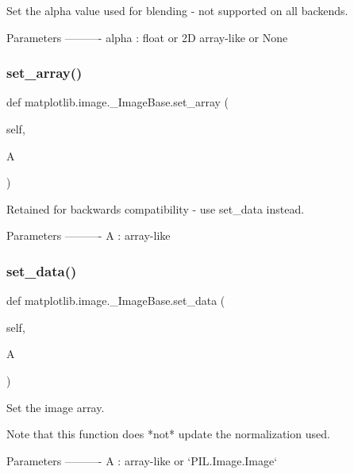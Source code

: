 \begin{DoxyVerb}Set the alpha value used for blending - not supported on all backends.

Parameters
----------
alpha : float or 2D array-like or None
\end{DoxyVerb}
 \mbox{\label{classmatplotlib_1_1image_1_1__ImageBase_a72eb246b58a230e18e8eeef1fee6d7b8}} 
\subsubsection{\texorpdfstring{set\+\_\+array()}{set\_array()}}
{\footnotesize\ttfamily def matplotlib.\+image.\+\_\+\+Image\+Base.\+set\+\_\+array (\begin{DoxyParamCaption}\item[{}]{self,  }\item[{}]{A }\end{DoxyParamCaption})}

\begin{DoxyVerb}Retained for backwards compatibility - use set_data instead.

Parameters
----------
A : array-like
\end{DoxyVerb}
 \mbox{\label{classmatplotlib_1_1image_1_1__ImageBase_a6300e9bfe249af97fc7a8df11086e03d}} 
\subsubsection{\texorpdfstring{set\+\_\+data()}{set\_data()}}
{\footnotesize\ttfamily def matplotlib.\+image.\+\_\+\+Image\+Base.\+set\+\_\+data (\begin{DoxyParamCaption}\item[{}]{self,  }\item[{}]{A }\end{DoxyParamCaption})}

\begin{DoxyVerb}Set the image array.

Note that this function does *not* update the normalization used.

Parameters
----------
A : array-like or `PIL.Image.Image`
\end{DoxyVerb}
 \mbox{\label{classmatplotlib_1_1image_1_1__ImageBase_aaf5954386fd1f0190880d51de66885d5}} 
